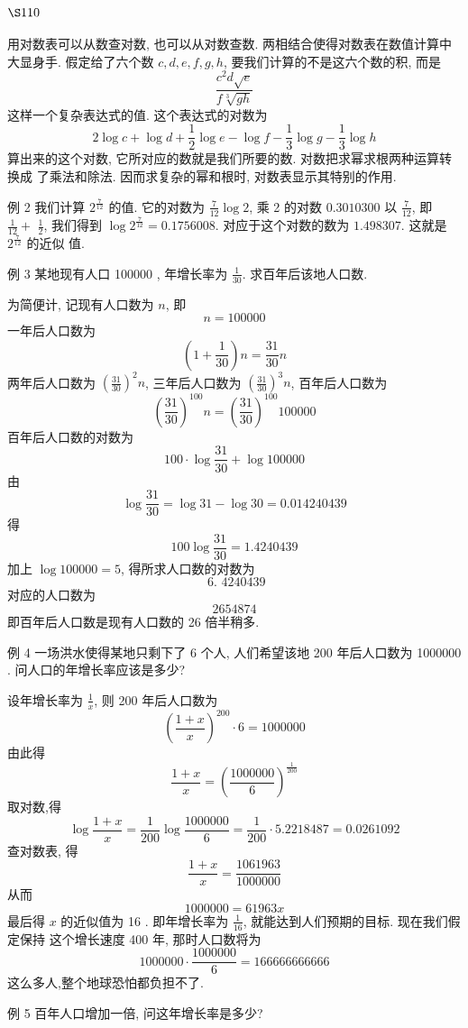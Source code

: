 \section{$\S 110$}

用对数表可以从数查对数, 也可以从对数查数. 两相结合使得对数表在数值计算中大显身手. 假定给了六个数 $c, d, e, f, g, h$, 要我们计算的不是这六个数的积, 而是
\[
\frac{c^{2} d \sqrt{e}}{f \sqrt[3]{g h}}
\]
这样一个复杂表达式的值. 这个表达式的对数为
\[
2 \log c+\log d+\frac{1}{2} \log e-\log f-\frac{1}{3} \log g-\frac{1}{3} \log h
\]
算出来的这个对数, 它所对应的数就是我们所要的数. 对数把求幂求根两种运算转换成 了乘法和除法. 因而求复杂的幂和根时, 对数表显示其特别的作用.

例 2 我们计算 $2^{\frac{7}{12}}$ 的值. 它的对数为 $\frac{7}{12} \log 2$, 乘 2 的对数 $0.3010300$ 以 $\frac{7}{12}$, 即 $\frac{1}{12}+$ $\frac{1}{2}$, 我们得到 $\log 2^{\frac{7}{12}}=0.1756008$. 对应于这个对数的数为 $1.498307$. 这就是 $2^{\frac{7}{12}}$ 的近似 值.

例 3 某地现有人口 100000 , 年增长率为 $\frac{1}{30}$. 求百年后该地人口数.

为简便计, 记现有人口数为 $n$, 即
\[
n=100000
\]
一年后人口数为
\[
\left(1+\frac{1}{30}\right) n=\frac{31}{30} n
\]
两年后人口数为 $\left(\frac{31}{30}\right)^{2} n$, 三年后人口数为 $\left(\frac{31}{30}\right)^{3} n$, 百年后人口数为
\[
\left(\frac{31}{30}\right)^{100} n=\left(\frac{31}{30}\right)^{100} 100000
\]
百年后人口数的对数为
\[
100 \cdot \log \frac{31}{30}+\log 100000
\]
由
\[
\log \frac{31}{30}=\log 31-\log 30=0.014240439
\]
得
\[
100 \log \frac{31}{30}=1.4240439
\]
加上 $\log 100000=5$, 得所求人口数的对数为
\[
\text { 6. } 4240439
\]
对应的人口数为
\[
2654874
\]
即百年后人口数是现有人口数的 26 倍半稍多.

例 4 一场洪水使得某地只剩下了 6 个人, 人们希望该地 200 年后人口数为 1000000 . 问人口的年增长率应该是多少?

设年增长率为 $\frac{1}{x}$, 则 200 年后人口数为
\[
\left(\frac{1+x}{x}\right)^{200} \cdot 6=1000000
\]
由此得
\[
\frac{1+x}{x}=\left(\frac{1000000}{6}\right)^{\frac{1}{200}}
\]
取对数,得
\[
\log \frac{1+x}{x}=\frac{1}{200} \log \frac{1000000}{6}=\frac{1}{200} \cdot 5.2218487=0.0261092
\]
查对数表, 得
\[
\frac{1+x}{x}=\frac{1061963}{1000000}
\]
从而
\[
1000000=61963 x
\]
最后得 $x$ 的近似值为 16 . 即年增长率为 $\frac{1}{16}$, 就能达到人们预期的目标. 现在我们假定保持 这个增长速度 400 年, 那时人口数将为
\[
1000000 \cdot \frac{1000000}{6}=166666666666
\]
这么多人,整个地球恐怕都负担不了.

例 5 百年人口增加一倍, 问这年增长率是多少?

